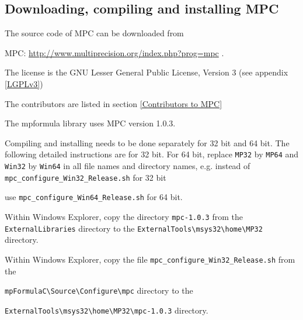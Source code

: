 \newpage
\subsection{Downloading, compiling and installing MPC}
The source code of MPC can be downloaded from

MPC: \href{http://www.multiprecision.org/index.php?prog=mpc}{http://www.multiprecision.org/index.php?prog=mpc} .

The license is the GNU Lesser General Public License, Version 3 (see appendix \ref{LGPLv3})

The contributors are listed in section \ref{Contributors to MPC}

The mpformula library uses MPC version 1.0.3.


\vpara
Compiling and installing needs to be done separately for 32 bit and 64 bit. The following detailed instructions are for 32 bit. For 64 bit, replace \verb|MP32| by \verb|MP64| and \verb|Win32| by  \verb|Win64| in all file names and directory names, e.g. instead of \verb|mpc_configure_Win32_Release.sh| for 32 bit

use \verb|mpc_configure_Win64_Release.sh| for 64 bit.

\vpara
Within Windows Explorer, copy the directory \verb|mpc-1.0.3|  from the \verb|ExternalLibraries|
directory to the \verb|ExternalTools\msys32\home\MP32| directory. 

\vpara
Within Windows Explorer, copy the file \verb|mpc_configure_Win32_Release.sh|  from the

\verb|mpFormulaC\Source\Configure\mpc| directory to the 

\verb|ExternalTools\msys32\home\MP32\mpc-1.0.3| directory.  


